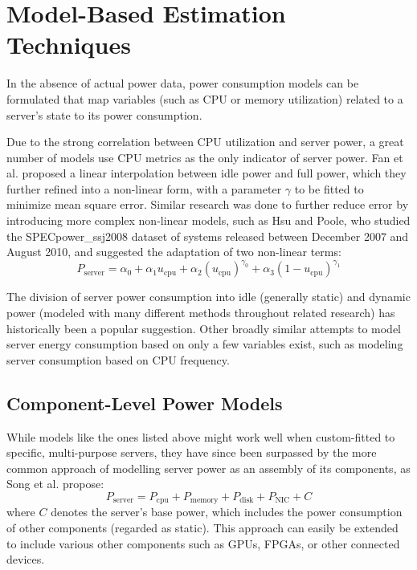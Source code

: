 \section{Model-Based Estimation Techniques}

In the absence of actual power data, power consumption models can be formulated that map variables (such as CPU or memory utilization) related to a server's state to its power consumption.

Due to the strong correlation between CPU utilization and server power, a great number of models use CPU metrics as the only indicator of server power. Fan et al.\parencite{fan2007power} proposed a linear interpolation between idle power and full power, which they further refined into a non-linear form, with a parameter $\gamma$ to be fitted to minimize mean square error. Similar research was done to further reduce error by introducing more complex non-linear models, such as Hsu and Poole\parencite{hsu2011power}, who studied the SPECpower\_ssj2008 dataset of systems released between December 2007 and August 2010, and suggested the adaptation of two non-linear terms:
\begin{equation}
    P_{\text{server}} = \alpha_0 + \alpha_1 u_{\text{cpu}} + \alpha_2 \left( u_{\text{cpu}} \right)^{\gamma_0} + \alpha_3 \left( 1 - u_{\text{cpu}} \right)^{\gamma_1}
\end{equation}

The division of server power consumption into idle (generally static) and dynamic power (modeled with many different methods throughout related research) has historically been a popular suggestion\parencite{beloglazovChapter3Taxonomy2011}. Other broadly similar attempts to model server energy consumption based on only a few variables exist, such as modeling server consumption based on CPU frequency\parencite{elnozahyEnergyEfficientServerClusters2003}.

\subsection{Component-Level Power Models}

While models like the ones listed above might work well when custom-fitted to specific, multi-purpose servers, they have since been surpassed by the more common approach of modelling server power as an assembly of its components, as Song et al.\parencite{song2013unified} propose:
\begin{equation}
    P_{\text{server}} = P_{\text{cpu}} + P_{\text{memory}} + P_{\text{disk}} + P_{\text{NIC}} + C
\end{equation}
where $C$ denotes the server's base power, which includes the power consumption of other components (regarded as static). This approach can easily be extended to include various other components such as GPUs, FPGAs, or other connected devices.

